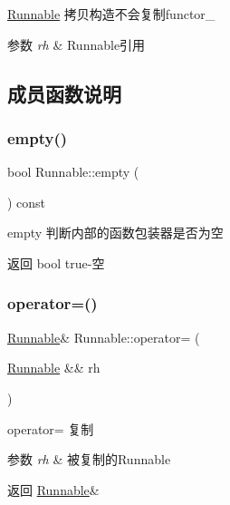\hyperlink{classRunnable}{Runnable} 拷贝构造不会复制functor\+\_\+ 


\begin{DoxyParams}{参数}
{\em rh} & Runnable引用 \\
\hline
\end{DoxyParams}


\subsection{成员函数说明}
\mbox{\label{classRunnable_a3abba14a5cf19709cef2d299ee68acae}} 
\subsubsection{\texorpdfstring{empty()}{empty()}}
{\footnotesize\ttfamily bool Runnable\+::empty (\begin{DoxyParamCaption}{ }\end{DoxyParamCaption}) const\hspace{0.3cm}{\ttfamily [inline]}}



empty 判断内部的函数包装器是否为空 

\begin{DoxyReturn}{返回}
bool true-\/空 
\end{DoxyReturn}
\mbox{\label{classRunnable_a572b61c98700ada8d241b122ddc80e2c}} 
\subsubsection{\texorpdfstring{operator=()}{operator=()}\hspace{0.1cm}{\footnotesize\ttfamily [1/2]}}
{\footnotesize\ttfamily \hyperlink{classRunnable}{Runnable}\& Runnable\+::operator= (\begin{DoxyParamCaption}\item[{\hyperlink{classRunnable}{Runnable} \&\&}]{rh }\end{DoxyParamCaption})\hspace{0.3cm}{\ttfamily [inline]}}



operator= 复制 


\begin{DoxyParams}{参数}
{\em rh} & 被复制的\+Runnable\\
\hline
\end{DoxyParams}
\begin{DoxyReturn}{返回}
\hyperlink{classRunnable}{Runnable}\& 
\end{DoxyReturn}
\mbox{\label{classRunnable_a4dca857ef9f64534673170bc3c8b72a1}} 
